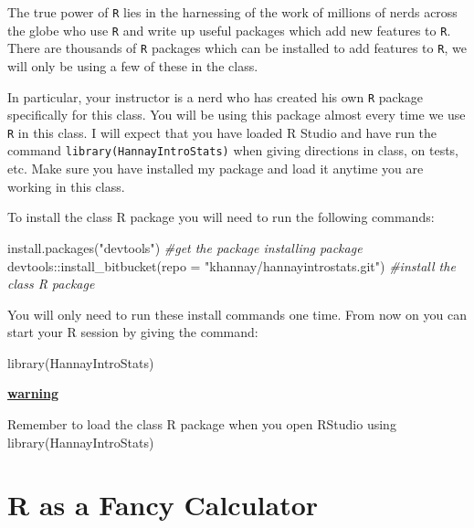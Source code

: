 \documentclass[
]{book}
\newenvironment{Shaded}{\begin{snugshade}}{\end{snugshade}}
\newcommand{\AttributeTok}[1]{\textcolor[rgb]{0.77,0.63,0.00}{#1}}
\newcommand{\CommentTok}[1]{\textcolor[rgb]{0.56,0.35,0.01}{\textit{#1}}}
\newcommand{\FunctionTok}[1]{\textcolor[rgb]{0.00,0.00,0.00}{#1}}
\newcommand{\NormalTok}[1]{#1}
\newcommand{\SpecialCharTok}[1]{\textcolor[rgb]{0.00,0.00,0.00}{#1}}
\newcommand{\StringTok}[1]{\textcolor[rgb]{0.31,0.60,0.02}{#1}}
\newenvironment{rmdblock}[1]
  {\begin{shaded*}
  \centerline{\underline{\textbf{#1}}}

  }
  {
  \end{shaded*}
  }
\newenvironment{warning}
  {\begin{rmdblock}{warning}}
  {\end{rmdblock}}
\theoremstyle{definition}
\theoremstyle{definition}
\theoremstyle{definition}
\theoremstyle{definition}
\theoremstyle{remark}
\begin{document}
The true power of \texttt{R} lies in the harnessing of the work of millions of nerds across the globe who use \texttt{R} and write up useful packages which add new features to \texttt{R}. There are thousands of \texttt{R} packages which can be installed to add features to \texttt{R}, we will only be using a few of these in the class.

In particular, your instructor is a nerd who has created his own \texttt{R} package specifically for this class. You will be using this package almost every time we use \texttt{R} in this class. I will expect that you have loaded R Studio and have run the command \texttt{library(HannayIntroStats)} when giving directions in class, on tests, etc. Make sure you have installed my package and load it anytime you are working in this class.

To install the class R package you will need to run the following commands:

\begin{Shaded}
\begin{Highlighting}[]
\FunctionTok{install.packages}\NormalTok{(}\StringTok{"devtools"}\NormalTok{)  }\CommentTok{\#get the package installing package}
\NormalTok{devtools}\SpecialCharTok{::}\FunctionTok{install\_bitbucket}\NormalTok{(}\AttributeTok{repo =} \StringTok{"khannay/hannayintrostats.git"}\NormalTok{)  }\CommentTok{\#install the class R package}
\end{Highlighting}
\end{Shaded}

You will only need to run these install commands one time. From now on you can start your R session by giving the command:

\begin{Shaded}
\begin{Highlighting}[]
\FunctionTok{library}\NormalTok{(HannayIntroStats)}
\end{Highlighting}
\end{Shaded}

\begin{warning}
Remember to load the class R package when you open RStudio using library(HannayIntroStats)
\end{warning}

\hypertarget{r-as-a-fancy-calculator}{%
\section{R as a Fancy Calculator}\label{r-as-a-fancy-calculator}}
\end{document}
